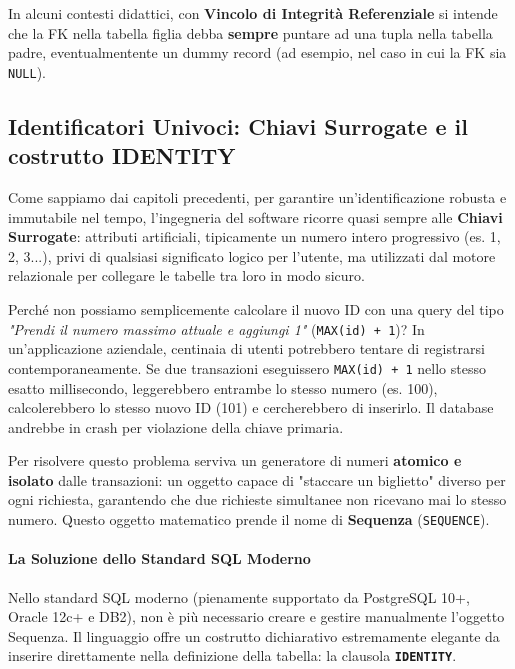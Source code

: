\begin{warningbox}[]
    In alcuni contesti didattici, con \textbf{Vincolo di Integrità Referenziale} si intende che la FK nella tabella figlia debba \textbf{sempre} puntare ad una tupla nella tabella padre, eventualmentente un dummy record (ad esempio, nel caso in cui la FK sia \texttt{NULL}). 
\end{warningbox}

\subsection{Identificatori Univoci: Chiavi Surrogate e il costrutto IDENTITY}

Come sappiamo dai capitoli precedenti, per garantire un'identificazione robusta e immutabile nel tempo, l'ingegneria del software ricorre quasi sempre alle \textbf{Chiavi Surrogate}: attributi artificiali, tipicamente un numero intero progressivo (es. 1, 2, 3...), privi di qualsiasi significato logico per l'utente, ma utilizzati dal motore relazionale per collegare le tabelle tra loro in modo sicuro.

\begin{dettagli}
    Perché non possiamo semplicemente calcolare il nuovo ID con una query del tipo \textit{"Prendi il numero massimo attuale e aggiungi 1"} (\texttt{MAX(id) + 1})?
    In un'applicazione aziendale, centinaia di utenti potrebbero tentare di registrarsi contemporaneamente. Se due transazioni eseguissero \texttt{MAX(id) + 1} nello stesso esatto millisecondo, leggerebbero entrambe lo stesso numero (es. 100), calcolerebbero lo stesso nuovo ID (101) e cercherebbero di inserirlo. Il database andrebbe in crash per violazione della chiave primaria. 

    Per risolvere questo problema serviva un generatore di numeri \textbf{atomico e isolato} dalle transazioni: un oggetto capace di "staccare un biglietto" diverso per ogni richiesta, garantendo che due richieste simultanee non ricevano mai lo stesso numero. Questo oggetto matematico prende il nome di \textbf{Sequenza} (\texttt{SEQUENCE}).
\end{dettagli}

\paragraph{La Soluzione dello Standard SQL Moderno}

Nello standard SQL moderno (pienamente supportato da PostgreSQL 10+, Oracle 12c+ e DB2), non è più necessario creare e gestire manualmente l'oggetto Sequenza. Il linguaggio offre un costrutto dichiarativo estremamente elegante da inserire direttamente nella definizione della tabella: la clausola \textbf{\texttt{IDENTITY}}.

